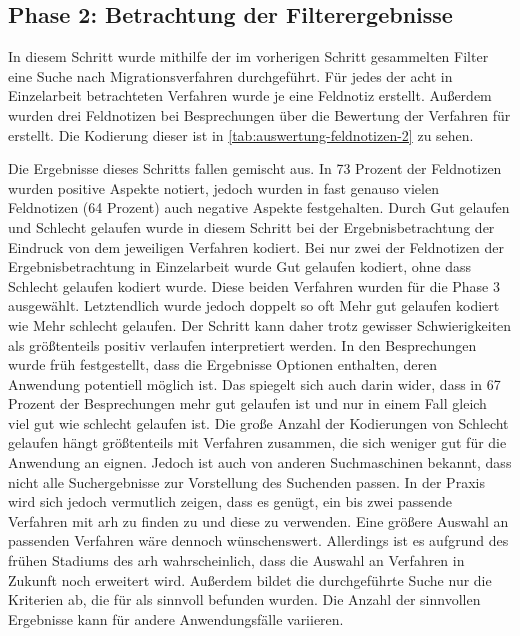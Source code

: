\subsection{Phase 2: Betrachtung der Filterergebnisse}

In diesem Schritt wurde mithilfe der im vorherigen Schritt gesammelten Filter eine Suche nach Migrationsverfahren durchgeführt.
Für jedes der acht in Einzelarbeit betrachteten Verfahren wurde je eine Feldnotiz erstellt.
Außerdem wurden drei Feldnotizen bei Besprechungen über die Bewertung der Verfahren für \jf erstellt.
Die Kodierung dieser ist in \cref{tab:auswertung-feldnotizen-2} zu sehen.



Die Ergebnisse dieses Schritts fallen gemischt aus.
In 73 Prozent der Feldnotizen wurden positive Aspekte notiert, jedoch wurden in fast genauso vielen Feldnotizen (64 Prozent) auch negative Aspekte festgehalten.
Durch \glqq Gut gelaufen\grqq{} und \glqq Schlecht gelaufen\grqq{} wurde in diesem Schritt bei der Ergebnisbetrachtung der Eindruck von dem jeweiligen Verfahren kodiert.
Bei nur zwei der Feldnotizen der Ergebnisbetrachtung in Einzelarbeit wurde \glqq Gut gelaufen\grqq{} kodiert, ohne dass \glqq Schlecht gelaufen\grqq{} kodiert wurde.
Diese beiden Verfahren wurden für die Phase 3 ausgewählt.
Letztendlich wurde jedoch doppelt so oft \glqq Mehr gut gelaufen\grqq{} kodiert wie \glqq Mehr schlecht gelaufen\grqq{}.
Der Schritt kann daher trotz gewisser Schwierigkeiten als größtenteils positiv verlaufen interpretiert werden.
In den Besprechungen wurde früh festgestellt, dass die Ergebnisse Optionen enthalten, deren Anwendung potentiell möglich ist.
Das spiegelt sich auch darin wider, dass in 67 Prozent der Besprechungen mehr gut gelaufen ist und nur in einem Fall gleich viel gut wie schlecht gelaufen ist.
Die große Anzahl der Kodierungen von \glqq Schlecht gelaufen\grqq{} hängt größtenteils mit Verfahren zusammen, die sich weniger gut für die Anwendung an \jf eignen.
Jedoch ist auch von anderen Suchmaschinen bekannt, dass nicht alle Suchergebnisse zur Vorstellung des Suchenden passen.
In der Praxis wird sich jedoch vermutlich zeigen, dass es genügt, ein bis zwei passende Verfahren mit \gls{arh} zu finden zu und diese zu verwenden.
Eine größere Auswahl an passenden Verfahren wäre dennoch wünschenswert.
Allerdings ist es aufgrund des frühen Stadiums des \gls{arh} wahrscheinlich, dass die Auswahl an Verfahren in Zukunft noch erweitert wird.
Außerdem bildet die durchgeführte Suche nur die Kriterien ab, die für \jf als sinnvoll befunden wurden.
Die Anzahl der sinnvollen Ergebnisse kann für andere Anwendungsfälle variieren.

